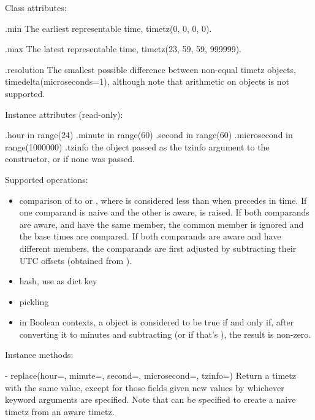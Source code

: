 Class attributes:

    .min
        The earliest representable time, timetz(0, 0, 0, 0).

    .max
        The latest representable time, timetz(23, 59, 59, 999999).

    .resolution
        The smallest possible difference between non-equal timetz
        objects, timedelta(microseconds=1), although note that
        arithmetic on  objects is not supported.

Instance attributes (read-only):

    .hour           in range(24)
    .minute         in range(60)
    .second         in range(60)
    .microsecond    in range(1000000)
    .tzinfo         the object passed as the tzinfo argument to the
                     constructor, or  if none
                    was passed.

Supported operations:

\begin{itemize}
  \item
    comparison of  to  or ,
    where  is considered less than  when  precedes
     in time.  If one comparand is naive and the other is aware,
     is raised.  If both comparands are aware, and
    have the same  member, the common 
    member is ignored and the base times are compared.  If both
    comparands are aware and have different  members,
    the comparands are first adjusted by subtracting their UTC offsets
    (obtained from ).

  \item
    hash, use as dict key

  \item
    pickling

  \item
    in Boolean contexts, a  object is considered to be
    true if and only if, after converting it to minutes and
    subtracting  (or  if that's
    ), the result is non-zero.
\end{itemize}

Instance methods:

  - replace(hour=, minute=, second=, microsecond=, tzinfo=)
    Return a timetz with the same value, except for those fields given
    new values by whichever keyword arguments are specified.  Note that
     can be specified to create a naive timetz from an
    aware timetz.

